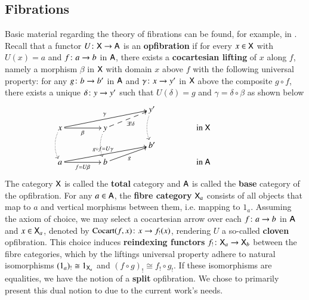 \documentclass[reqno]{amsart}
\begin{document}
\subsection{Fibrations}\label{sec:fibrations}
Basic material regarding the theory of fibrations can be found, for example, in \cite{Borc,Gray}. Recall that a functor $U \colon \mathsf{X} \to \mathsf{A}$ is an \textbf{opfibration} if for every $x\in\mathsf{X}$ with $U(x)=a$ and $f \colon a \to b$ in $\mathsf{A}$, there exists a \textbf{cocartesian lifting} of $x$ along $f$, namely a morphism $\beta$ in $\mathsf{X}$ with domain $x$ above $f$ with the following universal property: for any $g\colon b\to b'$ in $\mathsf{A}$ and $\gamma\colon x\to y'$ in $\mathsf{X}$ above the composite $g\circ f$, there exists a unique $\delta\colon y\to y'$ such that $U(\delta)=g$ and $\gamma=\delta\circ\beta$ as shown below
\begin{displaymath}
\xymatrix @R=.1in @C=.6in
{&& y'\ar @{.>}@/_/[dd] &&\\
x\ar[r]_-{\beta} \ar @{.>}@/_/[dd]
\ar[urr]^-{\gamma} & 
y \ar @{.>}@/_/[dd] \ar @{-->}[ur]_-{\exists! \delta}
&& \textrm{in }\X\\
&& b' &&\\
a\ar[r]_-{f=U\beta} \ar[urr]^-{g\circ f=U\gamma}
 & b \ar[ur]_-g && \textrm{in }\A}
\end{displaymath}
The category $\mathsf{X}$ is called the \textbf{total} category and $\mathsf{A}$ is called the \textbf{base} category of the opfibration. For any $a\in\mathsf{A}$, the \textbf{fibre category} $\mathsf{X}_a$ consists of all objects that map to $a$ and vertical morphisms between them, i.e. mapping to $1_a$.
Assuming the axiom of choice, we may select a cocartesian arrow over each $f\colon a\to b$ in $\mathsf{A}$ and $x\in\mathsf{X} _a$, denoted by $\mathrm{Cocart}(f,x)\colon x\to f_!(x)$, rendering $U$ a so-called \textbf{cloven} opfibration. This choice induces \textbf{reindexing functors} $f_!\colon\mathsf{X} _a\to\mathsf{X} _b$ between the fibre categories, which by the liftings universal property adhere to natural isomorphisms $(1_a)_!\cong1_{\mathsf{X} _a}$ and $(f\circ g)_!\cong f_!\circ g_!$. If these isomorphisms are equalities, we have the notion of a \textbf{split} opfibration. We chose to primarily present this dual notion to  due to the current work's needs.
\end{document}
